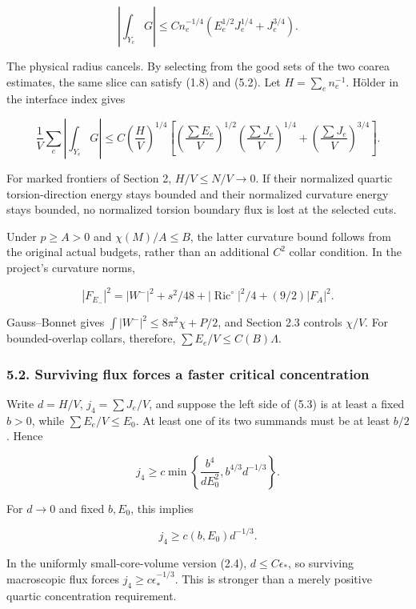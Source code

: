 \documentclass[
  11pt,
]{article}
\begin{document}
\[
 \boxed{\left|\int_{Y_e}G\right|
 \le C n_e^{-1/4}
                  (E_e^{1/2}J_e^{1/4}+J_e^{3/4}).}
 \tag{5.2}
\]

The physical radius cancels. By selecting from the good sets of the two
coarea estimates, the same slice can satisfy (1.8) and (5.2). Let
\(H=\sum_e n_e^{-1}\). Hölder in the interface index gives

\[
 \boxed{\frac1V\sum_e\left|\int_{Y_e}G\right|
 \le C\left(\frac HV\right)^{1/4}
 \left[
   \left(\frac{\sum E_e}V\right)^{1/2}
   \left(\frac{\sum J_e}V\right)^{1/4}
       +\left(\frac{\sum J_e}V\right)^{3/4}
 \right].}
 \tag{5.3}
\]

For marked frontiers of Section 2, \(H/V\le N/V\to0\). If their
normalized quartic torsion-direction energy stays bounded and their
normalized curvature energy stays bounded, no normalized torsion
boundary flux is lost at the selected cuts.

Under \(p\ge A>0\) and \(\chi(M)/A\le B\), the latter curvature bound
follows from the original actual budgets, rather than an additional
\(C^2\) collar condition. In the project's curvature norms,

\[
 |F_{E_-}|^2=|W^-|^2+s^2/48
                +|\operatorname{Ric}^{\circ}|^2/4+(9/2)|F_A|^2.
\]

Gauss--Bonnet gives \(\int|W^-|^2\le8\pi^2\chi+P/2\), and Section 2.3
controls \(\chi/V\). For bounded-overlap collars, therefore,
\(\sum E_e/V\le C(B)\Lambda\).

\hypertarget{surviving-flux-forces-a-faster-critical-concentration}{%
\subsubsection{5.2. Surviving flux forces a faster critical
concentration}\label{surviving-flux-forces-a-faster-critical-concentration}}

Write \(d=H/V\), \(j_4=\sum J_e/V\), and suppose the left side of (5.3)
is at least a fixed \(b>0\), while \(\sum E_e/V\le E_0\). At least one
of its two summands must be at least \(b/2\). Hence

\[
 j_4\ge c\min\left\{\frac{b^4}{dE_0^2},
                               b^{4/3}d^{-1/3}\right\}.
 \tag{5.4}
\]

For \(d\to0\) and fixed \(b,E_0\), this implies

\[
                 \boxed{j_4\ge c(b,E_0)d^{-1/3}.}
 \tag{5.5}
\]

In the uniformly small-core-volume version (2.4), \(d\le C\epsilon_*\),
so surviving macroscopic flux forces \(j_4\ge c\epsilon_*^{-1/3}\). This
is stronger than a merely positive quartic concentration requirement.
\end{document}
